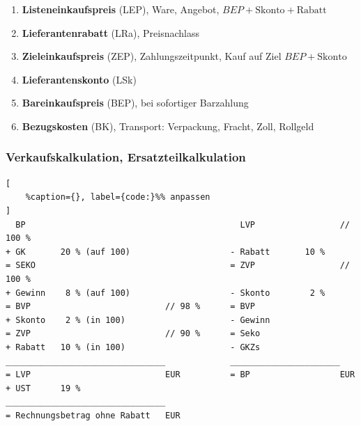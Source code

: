 \begin{enumerate}
\item
  \textbf{Listeneinkaufspreis} (LEP), Ware, Angebot,
  $\boxed{BEP + \text{Skonto} + \text{Rabatt}}$
\item
  \textbf{Lieferantenrabatt} (LRa), Preisnachlass
\item
  \textbf{Zieleinkaufspreis} (ZEP), Zahlungszeitpunkt, Kauf auf Ziel
  $\boxed{BEP + \text{Skonto}}$
\item
  \textbf{Lieferantenskonto} (LSk)
\item
  \textbf{Bareinkaufspreis} (BEP), bei sofortiger Barzahlung
\item
  \textbf{Bezugskosten} (BK), Transport: Verpackung, Fracht, Zoll,
  Rollgeld
\end{enumerate}

\subsubsection{Verkaufskalkulation,
Ersatzteilkalkulation}\label{verkaufskalkulation-ersatzteilkalkulation}

\lstset{language=Python}%
\begin{lstlisting}[
	%caption={}, label={code:}%% anpassen
]
  BP                                           LVP                 // 100 %
+ GK       20 % (auf 100)                    - Rabatt       10 %                 
= SEKO                                       = ZVP                 // 100 %
+ Gewinn    8 % (auf 100)                    - Skonto        2 %
= BVP                           // 98 %      = BVP        
+ Skonto    2 % (in 100)                     - Gewinn
= ZVP                           // 90 %      = Seko                 
+ Rabatt   10 % (in 100)                     - GKZs
________________________________             ______________________          
= LVP                           EUR          = BP                  EUR
+ UST      19 %                                                 
________________________________                        
= Rechnungsbetrag ohne Rabatt   EUR                                 
\end{lstlisting}

